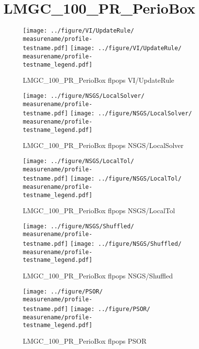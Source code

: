 \documentclass[a4paper]{article}
\begin{document}
\makeRR   %

\def\measurename{flpops}

\def\figwidth{0.8\textwidth}

\def\testname{LMGC_100_PR_PerioBox}
\def\testnamechar{LMGC\_100\_PR\_PerioBox}
\section{\testnamechar}
\begin{figure}[htbp]
  \centering
  \texttt{[image: ../figure/VI/UpdateRule/\\measurename/profile-\\testname.pdf]}
  \texttt{[image: ../figure/VI/UpdateRule/\\measurename/profile-\\testname\_legend.pdf]}
\caption{\testnamechar{  } \measurename{  } VI/UpdateRule}
\end{figure}
\begin{figure}[htbp]
  \centering
  \texttt{[image: ../figure/NSGS/LocalSolver/\\measurename/profile-\\testname.pdf]}
  \texttt{[image: ../figure/NSGS/LocalSolver/\\measurename/profile-\\testname\_legend.pdf]}
\caption{\testnamechar{  } \measurename { }NSGS/LocalSolver}
\end{figure}
\begin{figure}[htbp]
  \centering
  \texttt{[image: ../figure/NSGS/LocalTol/\\measurename/profile-\\testname.pdf]}
  \texttt{[image: ../figure/NSGS/LocalTol/\\measurename/profile-\\testname\_legend.pdf]}
\caption{\testnamechar{  } \measurename { }NSGS/LocalTol}
\end{figure}

\begin{figure}[htbp]
  \centering
  \texttt{[image: ../figure/NSGS/Shuffled/\\measurename/profile-\\testname.pdf]}
  \texttt{[image: ../figure/NSGS/Shuffled/\\measurename/profile-\\testname\_legend.pdf]}
\caption{\testnamechar{  } \measurename { }NSGS/Shuffled}
\end{figure}

\begin{figure}[htbp]
  \centering
  \texttt{[image: ../figure/PSOR/\\measurename/profile-\\testname.pdf]}
  \texttt{[image: ../figure/PSOR/\\measurename/profile-\\testname\_legend.pdf]}
\caption{\testnamechar{  } \measurename { }PSOR}
\end{figure}
\end{document}
